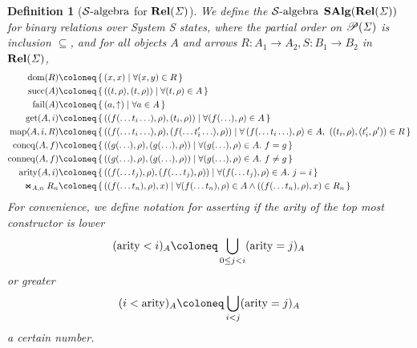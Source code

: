 \documentclass{article}
\newtheorem{definition}[theorem]{Definition}
\newcommand{\fail}{\ensuremath \text{$\uparrow$}}
\newcommand{\dom}{\ensuremath \operatorname{dom}}
\newcommand{\Pow}{\ensuremath \mathscr{P}}
\newcommand{\Cat}[1]{\ensuremath \mathbf{#1}}
\newcommand{\State}{\ensuremath \mathit{\Sigma} }
\newcommand{\setbuild}[2]{\ensuremath \left\{\, #1 \mid #2 \,\right\}}
\newcommand{\Rel}{\ensuremath \Cat{Rel}}
\newcommand{\SAlgebra}{\ensuremath \mathcal{S}\text{-algebra}}
\newcommand{\SAlg}{\ensuremath \Cat{SAlg}}
\newcommand{\lfail}{\ensuremath \operatorname{fail}}
\newcommand{\lsucc}{\ensuremath \operatorname{succ}}
\newcommand{\get}{\ensuremath \operatorname{get}}
\newcommand{\map}{\ensuremath \operatorname{map}}
\newcommand{\arity}{\ensuremath \operatorname{arity}}
\newcommand{\coneq}{\ensuremath \operatorname{coneq}}
\newcommand{\conneq}{\ensuremath \operatorname{conneq}}
\newcommand{\witharity}{\ensuremath \Join}
\begin{document}
\begin{definition}[$\SAlgebra$ for $\Rel(\State)$] \normalfont
  We define the $\SAlgebra$ $\SAlg(\Rel(\State))$ for binary relations over System S states, where the partial order on $\Pow(\State)$ is inclusion $\subseteq$, and for all objects $A$ and arrows $R : A_1 \rightarrow A_2, S : B_1 \rightarrow B_2$ in $\Rel(\State)$,
  \begin{align*}
    \dom(R) &\coloneq \setbuild{(x,x)}{ \forall (x,y) \in R } \\
    \lsucc(A) &\coloneq \setbuild{((t,\rho),(t,\rho))}{ \forall (t,\rho) \in A } \\
    \lfail(A) &\coloneq \setbuild{(a,\fail)}{\forall a \in A} \\
    \get(A,i) &\coloneq \setbuild{ ((f(\ldots t_i \ldots),\rho), (t_i,\rho)) }{ \forall (f(\ldots),\rho) \in A } \\
    \map(A,i,R) &\coloneq \setbuild{ ((f(\ldots t_i \ldots),\rho),(f(\ldots t_i' \ldots),\rho)) }{ \forall\, (f(\ldots t_i \ldots),\rho) \in A,\ ((t_i,\rho),(t_i',\rho')) \in R } \\
    \coneq(A,f) &\coloneq \setbuild{ ((g(\ldots),\rho),(g(\ldots),\rho)) }{ \forall (g(\ldots),\rho) \in A.\ f = g } \\
    \conneq(A,f) &\coloneq \setbuild{ ((g(\ldots),\rho),(g(\ldots),\rho)) }{ \forall (g(\ldots),\rho) \in A.\ f \neq g } \\
    \arity(A,i) &\coloneq \setbuild{ ((f(\ldots t_j),\rho),(f(\ldots t_j),\rho)) }{ \forall (f(\ldots t_j),\rho) \in A.\ j = i } \\
    \witharity_{A,n} R_n &\coloneq \setbuild{ ((f(\ldots t_n),\rho),x) }{ \forall (f(\ldots t_n),\rho) \in A \land ((f(\ldots t_n),\rho),x) \in R_n }
  \end{align*}
  For convenience, we define notation for asserting if the arity of the top most constructor is lower \[ (\arity < i)_A \coloneq \bigcup_{0 \leq j < i} (\arity = j)_A \] or greater \[ (i < \arity)_A \coloneq \bigcup_{i < j} (\arity = j)_A \] a certain number.
\end{definition}
\end{document}
